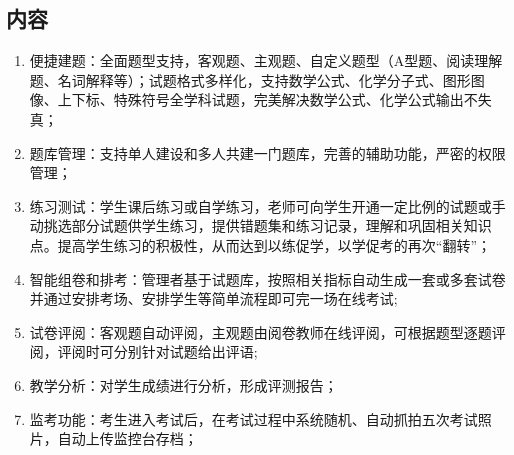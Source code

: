 \subsection{内容}
\begin{enumerate}
	\item 便捷建题：全面题型支持，客观题、主观题、自定义题型（A型题、阅读理解题、名词解释等）；试题格式多样化，支持数学公式、化学分子式、图形图像、上下标、特殊符号全学科试题，完美解决数学公式、化学公式输出不失真；
	\item 题库管理：支持单人建设和多人共建一门题库，完善的辅助功能，严密的权限管理；
	\item 练习测试：学生课后练习或自学练习，老师可向学生开通一定比例的试题或手动挑选部分试题供学生练习，提供错题集和练习记录，理解和巩固相关知识点。提高学生练习的积极性，从而达到以练促学，以学促考的再次“翻转”；
	\item 智能组卷和排考：管理者基于试题库，按照相关指标自动生成一套或多套试卷并通过安排考场、安排学生等简单流程即可完一场在线考试;
	\item 试卷评阅：客观题自动评阅，主观题由阅卷教师在线评阅，可根据题型逐题评阅，评阅时可分别针对试题给出评语;
	\item 教学分析：对学生成绩进行分析，形成评测报告；
	\item 监考功能：考生进入考试后，在考试过程中系统随机、自动抓拍五次考试照片，自动上传监控台存档；
\end{enumerate}




